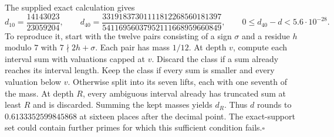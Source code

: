 The supplied exact calculation gives
\[
 d_{10}=\frac{14143023}{23059204},\qquad
 d_{40}=\frac{33191837301111812268560181397}
              {54116956037952111668959660849},\qquad
 0\le d_{40}-d<5.6\cdot10^{-28}.
\]
To reproduce it, start with the twelve pairs consisting of a sign
$\sigma$ and a residue $h$ modulo $7$ with $7\nmid 2h+\sigma$.
Each pair has mass $1/12$. At depth $v$, compute each interval sum
with valuations capped at $v$. Discard the class if a sum already
reaches its interval length. Keep the class if every sum is smaller
and every valuation below $v$. Otherwise split into its seven lifts,
each with one seventh of the mass. At depth $R$, every ambiguous
interval already has truncated sum at least $R$ and is discarded.
Summing the kept masses yields $d_R$.
Thus $d$ rounds to $0.6133352599845868$ at sixteen places after the
decimal point. The exact-support set could contain further primes
for which this sufficient condition fails.\hfill$\square$
